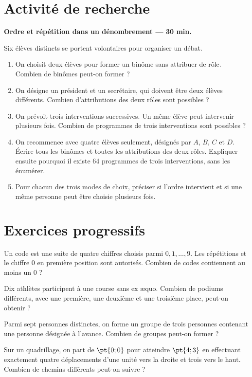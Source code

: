 \section{Activité de recherche}\textbf{Ordre et répétition dans un dénombrement --- 30 min.}\par Six élèves distincts se portent volontaires pour organiser un débat.
\begin{enumerate}\item On choisit deux élèves pour former un binôme sans attribuer de rôle. Combien de binômes peut-on former ?
\item On désigne un président et un secrétaire, qui doivent être deux élèves différents. Combien d'attributions des deux rôles sont possibles ?
\item On prévoit trois interventions successives. Un même élève peut intervenir plusieurs fois. Combien de programmes de trois interventions sont possibles ?
\item On recommence avec quatre élèves seulement, désignés par $A$, $B$, $C$ et $D$. Écrire tous les binômes et toutes les attributions des deux rôles. Expliquer ensuite pourquoi il existe $64$ programmes de trois interventions, sans les énumérer.
\item Pour chacun des trois modes de choix, préciser si l'ordre intervient et si une même personne peut être choisie plusieurs fois.\end{enumerate}

\mxnewpage
\section{Exercices progressifs}

Un code est une suite de quatre chiffres choisis parmi $0,1,\ldots,9$. Les répétitions et le chiffre $0$ en première position sont autorisés. Combien de codes contiennent au moins un $0$ ?

Dix athlètes participent à une course sans ex æquo. Combien de podiums différents, avec une première, une deuxième et une troisième place, peut-on obtenir ?

Parmi sept personnes distinctes, on forme un groupe de trois personnes contenant une personne désignée à l'avance. Combien de groupes peut-on former ?

Sur un quadrillage, on part de $\pt{0;0}$ pour atteindre $\pt{4;3}$ en effectuant exactement quatre déplacements d'une unité vers la droite et trois vers le haut. Combien de chemins différents peut-on suivre ?

